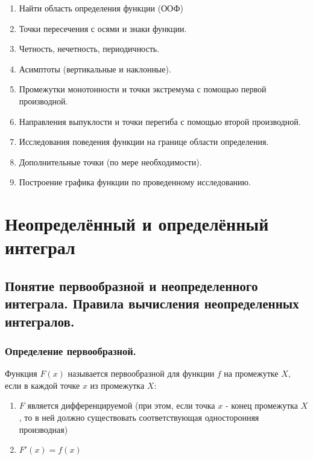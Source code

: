 \documentclass[a4paper,12pt]{article}
\theoremstyle{plain} %
\theoremstyle{definition} %
\theoremstyle{remark} %
\begin{document}
\begin{enumerate}
	\item Найти область определения функции (ООФ)
	\item Точки пересечения с осями и знаки функции.
	\item Четность, нечетность, периодичность.
	\item Асимптоты (вертикальные и наклонные).
	\item Промежутки монотонности и точки экстремума с помощью первой производной.
	\item Направления выпуклости и точки перегиба с помощью второй производной.
	\item Исследования поведения функции на границе области определения.
	\item Дополнительные точки (по мере необходимости).
	\item Построение графика функции по проведенному исследованию.
\end{enumerate}



\newpage
{}
\section*{Неопределённый и определённый интеграл}

\subsection*{Понятие первообразной и неопределенного интеграла. Правила вычисления неопределенных интегралов.}

\subsubsection*{Определение первообразной.}
Функция $F(x)$ называется первообразной для функции $f$ на промежутке $X$, если в каждой точке $x$ из промежутка $X$:
\begin{enumerate}
	\item $F$ является дифференцируемой (при этом, если точка $x$ - конец промежутка $X$, то в ней должно существовать соответствующая односторонняя производная)
	\item $F'(x) = f(x)$
\end{enumerate}
\end{document}
